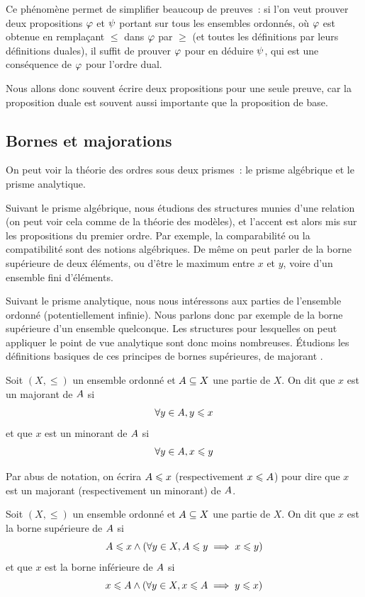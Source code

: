 Ce phénomène permet de simplifier beaucoup de preuves~: si l'on veut prouver
deux propositions $\varphi$ et $\psi$ portant sur tous les ensembles ordonnés,
où $\varphi$ est obtenue en remplaçant $\leq$ dans $\varphi$ par $\geq$ (et toutes
les définitions par leurs définitions duales), il suffit de prouver $\varphi$
pour en déduire $\psi$, qui est une conséquence de $\varphi$ pour l'ordre dual.

Nous allons donc souvent écrire deux propositions pour une seule preuve, car la
proposition duale est souvent aussi importante que la proposition de base.

\subsection{Bornes et majorations}

On peut voir la théorie des ordres sous deux prismes~: le prisme algébrique et
le prisme analytique.

Suivant le prisme algébrique, nous étudions des structures
munies d'une relation (on peut voir cela comme de la théorie des modèles), et
l'accent est alors mis sur les propositions du premier ordre. Par exemple,
la comparabilité ou la compatibilité sont des notions algébriques. De même on
peut parler de la borne supérieure de deux éléments, ou d'être le maximum entre
$x$ et $y$, voire d'un ensemble fini d'éléments.

Suivant le prisme analytique, nous nous intéressons aux parties de l'ensemble
ordonné (potentiellement infinie). Nous parlons donc par exemple de la borne
supérieure d'un ensemble quelconque. Les structures pour lesquelles on peut
appliquer le point de vue analytique sont donc moins nombreuses.
\'Etudions les définitions basiques de ces principes de bornes supérieures,
de majorant .

\begin{definition}
  Soit $(X,\leq)$ un ensemble ordonné et $A\subseteq X$ une partie de $X$.
  On dit que $x$ est un majorant de $A$ si
  \[\forall y\in A, y \leqslant x\]
  et que $x$ est un minorant de $A$ si
  \[\forall y\in A, x \leqslant y\]

  Par abus de notation, on écrira $A\leqslant x$ (respectivement $x\leqslant A$)
  pour dire que $x$ est un majorant (respectivement un minorant) de $A$.
\end{definition}

\begin{definition}
  Soit $(X,\leq)$ un ensemble ordonné et $A\subseteq X$ une partie de $X$.
  On dit que $x$ est la borne supérieure de $A$ si
  \[A\leqslant x \land (\forall y\in X, A\leqslant y \implies x \leqslant y)\]
  et que $x$ est la borne inférieure de $A$ si
  \[x\leqslant A \land (\forall y\in X, x\leqslant A \implies y \leqslant x)\]
\end{definition}

